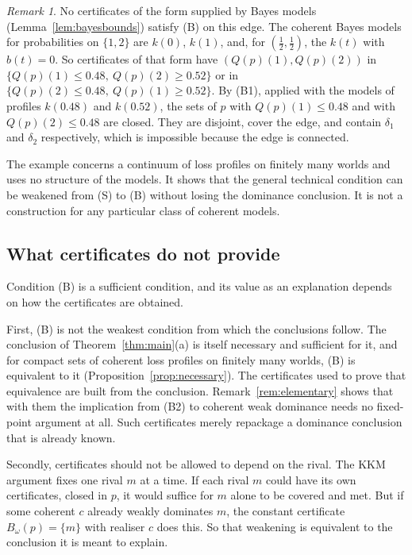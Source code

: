 \documentclass[11pt]{article}
\theoremstyle{definition}
\theoremstyle{remark}
\newtheorem{remark}[theorem]{Remark}
\begin{document}
\begin{remark}
No certificates of the form supplied by Bayes models (Lemma~\ref{lem:bayesbounds}) satisfy (B) on this edge. The coherent Bayes models for probabilities on $\{1,2\}$ are $k(0)$, $k(1)$, and, for $(\tfrac12,\tfrac12)$, the $k(t)$ with $b(t)=0$. So certificates of that form have $(Q(p)(1),Q(p)(2))$ in $\{Q(p)(1)\le0.48,\ Q(p)(2)\ge0.52\}$ or in $\{Q(p)(2)\le0.48,\ Q(p)(1)\ge0.52\}$. By (B1), applied with the models of profiles $k(0.48)$ and $k(0.52)$, the sets of $p$ with $Q(p)(1)\le0.48$ and with $Q(p)(2)\le0.48$ are closed. They are disjoint, cover the edge, and contain $\delta_1$ and $\delta_2$ respectively, which is impossible because the edge is connected.
\end{remark}

The example concerns a continuum of loss profiles on finitely many worlds and uses no structure of the models. It shows that the general technical condition can be weakened from (S) to (B) without losing the dominance conclusion. It is not a construction for any particular class of coherent models.

\subsection{What certificates do not provide}\label{sec:limits}
Condition (B) is a sufficient condition, and its value as an explanation depends on how the certificates are obtained.

First, (B) is not the weakest condition from which the conclusions follow. The conclusion of Theorem~\ref{thm:main}(a) is itself necessary and sufficient for it, and for compact sets of coherent loss profiles on finitely many worlds, (B) is equivalent to it (Proposition~\ref{prop:necessary}). The certificates used to prove that equivalence are built from the conclusion. Remark~\ref{rem:elementary} shows that with them the implication from (B2) to coherent weak dominance needs no fixed-point argument at all. Such certificates merely repackage a dominance conclusion that is already known.

Secondly, certificates should not be allowed to depend on the rival. The KKM argument fixes one rival $m$ at a time. If each rival $m$ could have its own certificates, closed in $p$, it would suffice for $m$ alone to be covered and met. But if some coherent $c$ already weakly dominates $m$, the constant certificate $B_\omega(p)=\{m\}$ with realiser $c$ does this. So that weakening is equivalent to the conclusion it is meant to explain.
\end{document}
